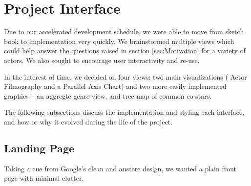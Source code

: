 \documentclass[12pt]{article}
\begin{document}
\section{Project Interface}
Due to our accelerated development schedule, we were able to move from sketch book to implementation very quickly. We brainstormed multiple views which could help answer the questions raised in section \ref{sec:Motivation} for a variety of actors.  We also sought to encourage user interactivity and re-use.  

In the interest of time, we  decided on four views:  two main visualizations ( Actor Filmography and a Parallel Axis Chart) and two more easily implemented graphics -- an aggregte genre view, and tree map of common co-stars.

The following subsections discuss the implementation and styling each interface, and how or why it evolved during the life of the project.  

\subsection{Landing Page}

  Taking a cue from Google's clean and austere design, we wanted a plain front page with minimal clutter.
  
\end{document}
